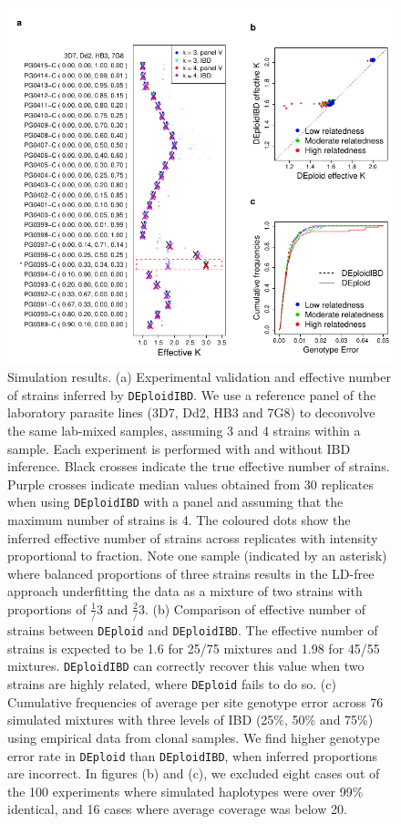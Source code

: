 \documentclass[9pt,lineno]{elife}
\begin{document}
\begin{figure}[htp]
  \begin{center}
  \includegraphics[width=\textwidth]{Fig2.pdf}
  \caption{Simulation results. (a) Experimental validation and effective number of strains inferred by {\tt DEploidIBD}. We use a reference panel of the laboratory parasite lines (3D7, Dd2, HB3 and 7G8) to deconvolve the same lab-mixed samples, assuming 3 and 4 strains within a sample. Each experiment is performed with and without IBD inference. Black crosses indicate the true effective number of strains. Purple crosses indicate median values obtained from 30 replicates when using {\tt DEploidIBD} with a panel and assuming that the maximum number of strains is 4. The coloured dots show the inferred effective number of strains across replicates with intensity proportional to fraction. Note one sample (indicated by an asterisk) where balanced proportions of three strains results in the LD-free approach underfitting the data as a mixture of two strains with proportions of $\tfrac{1}/{3}$ and $\tfrac{2}/{3}$.  (b) Comparison of effective number of strains between \texttt{DEploid} and \texttt{DEploidIBD}. The effective number of strains is expected to be 1.6 for 25/75 mixtures and 1.98 for 45/55 mixtures. \texttt{DEploidIBD} can correctly recover this value when two strains are highly related, where \texttt{DEploid} fails to do so. (c) Cumulative frequencies of average per site genotype error across 76 simulated mixtures with three levels of IBD (25\%, 50\% and 75\%) using empirical data from clonal samples. We find higher genotype error rate in \texttt{DEploid} than \texttt{DEploidIBD}, when inferred proportions are incorrect. In figures (b) and (c), we excluded eight cases out of the 100 experiments where simulated haplotypes were over 99\% identical, and 16 cases where average coverage was below 20.
}
\end{center}
\end{figure}
\end{document}
